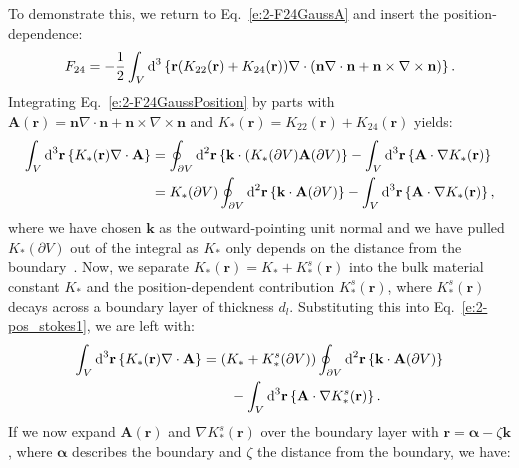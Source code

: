 To demonstrate this, we return to Eq.~\ref{e:2-F24GaussA} and insert the position-dependence:
\begin{equation}
  F_{24} = -\frac{1}{2}\int_{V}\textup{d}^3 \left \{\mathbf{r} (K_{22} (\mathbf{r}) + K_{24}(\mathbf{r})) \nabla \cdot (\mathbf{n} \nabla \cdot \mathbf{n} + \mathbf{n} \times \nabla \times \mathbf{n}) \right \}.\label{e:2-F24GaussPosition}
\end{equation}
Integrating Eq.~\ref{e:2-F24GaussPosition} by parts with $\mathbf{A}(\mathbf{r}) = \mathbf{n} \nabla \cdot \mathbf{n} + \mathbf{n} \times \nabla \times \mathbf{n}$ and \newline $K_*(\mathbf{r}) = K_{22} (\mathbf{r}) + K_{24}(\mathbf{r})$ yields:
\begin{align}
  \int_{V}\textup{d}^3\mathbf{r} \left \{ K_{*} (\mathbf{r}) \nabla \cdot \mathbf{A} \right \} &=
  \oint_{\partial V}\textup{d}^2 \mathbf{r} \left \{ \mathbf{k} \cdot (K_{*} (\partial V) \mathbf{A}(\partial V) \right \} -  \int_{V} \textup{d}^3\mathbf{r} \left \{ \mathbf{A} \cdot \nabla K_{*} (\mathbf{r}) \right \}  \\ &=
  K_*(\partial V) \oint_{\partial V} \textup{d}^2\mathbf{r} \left \{ \mathbf{k} \cdot \mathbf{A}(\partial V)\right \} - \int_{V} \textup{d}^3\mathbf{r} \left \{ \mathbf{A} \cdot \nabla K_{*} (\mathbf{r}) \right \}, \label{e:2-pos_stokes1}
\end{align}
where we have chosen $\mathbf{k}$ as the outward-pointing unit normal and we have pulled $K_*(\partial V)$ out of the integral as $K_*$ only depends on the distance from the boundary~\cite{RN55}.
Now, we separate $K_*(\mathbf{r}) = K_* + K_*^s(\mathbf{r})$ into the bulk material constant $K_*$ and the position-dependent contribution $K_*^s(\mathbf{r})$, where $K_*^s(\mathbf{r})$ decays across a boundary layer of thickness $d_l$.
Substituting this into Eq.~\ref{e:2-pos_stokes1}, we are left with:
\begin{align}
  \int_{V}\textup{d}^3\mathbf{r} \left \{ K_{*} (\mathbf{r}) \nabla \cdot \mathbf{A} \right \} &=
  (K_*+K_*^s(\partial V)) \oint_{\partial V} \textup{d}^2\mathbf{r} \left \{ \mathbf{k} \cdot \mathbf{A}(\partial V)\right \} \nonumber \\&
  \quad \quad - \int_{V} \textup{d}^3\mathbf{r} \left \{ \mathbf{A} \cdot \nabla K_{*}^s (\mathbf{r}) \right \}. \label{e:2-pos_stokes2}
\end{align}
If we now expand $\mathbf{A}(\mathbf{r})$ and $\nabla K_*^s(\mathbf{r})$ over the boundary layer with $\mathbf{r} = \bm{\alpha} - \zeta \mathbf{k}$, where $\bm{\alpha}$ describes the boundary and $\zeta$ the distance from the boundary, we have:
